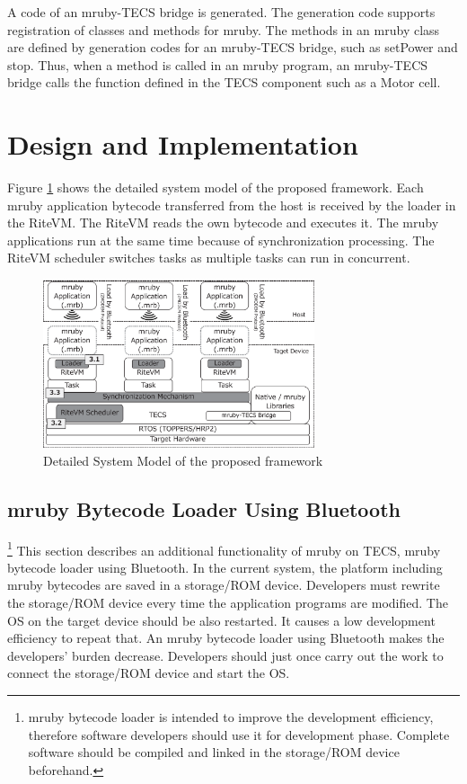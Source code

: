 \documentclass{sig-alternate-05-2015}
\begin{document}
A code of an mruby-TECS bridge is generated.
The generation code supports registration of classes and methods for mruby.
The methods in an mruby class are defined by generation codes for an mruby-TECS bridge, such as setPower and stop.
Thus, when a method is called in an mruby program, an mruby-TECS bridge calls the function defined in the TECS component such as a Motor {\myit cell}.

\section{Design and Implementation}
\label{sec:Design and Implementation}
Figure \ref{fig:system_model} shows the detailed system model of the proposed framework.
Each mruby application bytecode transferred from the host is received by the loader in the RiteVM.
The RiteVM reads the own bytecode and executes it.
The mruby applications run at the same time because of synchronization processing.
The RiteVM scheduler switches tasks as multiple tasks can run in concurrent.

\begin{figure}[t]
    \centering
    \includegraphics[width=8cm,clip]{figure/system_model.eps}
    \caption{Detailed System Model of the proposed framework}
    \label{fig:system_model}
\end{figure}

\subsection{mruby Bytecode Loader Using Bluetooth}
\label{sec:mruby bytecode loader using Bluetooth}
\footnote{
mruby bytecode loader is intended to improve the development efficiency, therefore software developers should use it for development phase.
Complete software should be compiled and linked in the storage/ROM device beforehand.
}
This section describes an additional functionality of mruby on TECS, mruby bytecode loader using Bluetooth.
In the current system, the platform including mruby bytecodes are saved in a storage/ROM device.
Developers must rewrite the storage/ROM device every time the application programs are modified.
The OS on the target device should be also restarted.
It causes a low development efficiency to repeat that.
An mruby bytecode loader using Bluetooth makes the developers' burden decrease.
Developers should just once carry out the work to connect the storage/ROM device and start the OS. 
\end{document}
